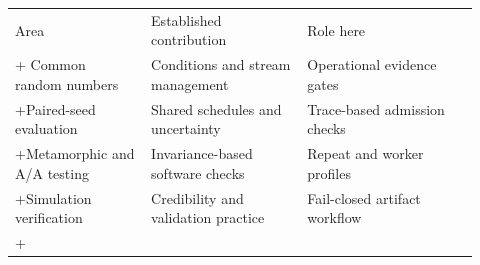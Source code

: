 \begin{tabular}{p{0.27\linewidth}p{0.31\linewidth}p{0.34\linewidth}}
\toprule
Area & Established contribution & Role here \\
+\midrule
Common random numbers & Conditions and stream management & Operational evidence gates \\
+Paired-seed evaluation & Shared schedules and uncertainty & Trace-based admission checks \\
+Metamorphic and A/A testing & Invariance-based software checks & Repeat and worker profiles \\
+Simulation verification & Credibility and validation practice & Fail-closed artifact workflow \\
+\bottomrule
\end{tabular}
